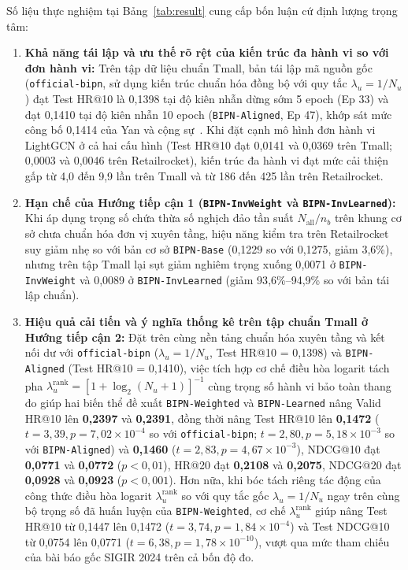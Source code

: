 \documentclass{llncs}
\begin{document}
Số liệu thực nghiệm tại Bảng~\ref{tab:result} cung cấp bốn luận cứ định lượng trọng tâm:
\begin{enumerate}
\item \textbf{Khả năng tái lập và ưu thế rõ rệt của kiến trúc đa hành vi so với đơn hành vi:} Trên tập dữ liệu chuẩn Tmall, bản tái lập mã nguồn gốc (\texttt{official-bipn}, sử dụng kiến trúc chuẩn hóa đồng bộ với quy tắc $\lambda_u = 1/N_u$) đạt Test HR@10 là 0{,}1398 tại độ kiên nhẫn dừng sớm 5 epoch (Ep 33) và đạt 0{,}1410 tại độ kiên nhẫn 10 epoch (\texttt{BIPN-Aligned}, Ep 47), khớp sát mức công bố 0{,}1414 của Yan và cộng sự~\cite{yan2024bipn}. Khi đặt cạnh mô hình đơn hành vi LightGCN ở cả hai cấu hình (Test HR@10 đạt 0{,}0141 và 0{,}0369 trên Tmall; 0{,}0003 và 0{,}0046 trên Retailrocket), kiến trúc đa hành vi đạt mức cải thiện gấp từ 4{,}0 đến 9{,}9 lần trên Tmall và từ 186 đến 425 lần trên Retailrocket.
\item \textbf{Hạn chế của Hướng tiếp cận 1 (\texttt{BIPN-InvWeight} và \texttt{BIPN-InvLearned}):} Khi áp dụng trọng số chứa thừa số nghịch đảo tần suất $N_{\mathrm{all}}/n_b$ trên khung cơ sở chưa chuẩn hóa đơn vị xuyên tầng, hiệu năng kiểm tra trên Retailrocket suy giảm nhẹ so với bản cơ sở \texttt{BIPN-Base} (0{,}1229 so với 0{,}1275, giảm 3{,}6\%), nhưng trên tập Tmall lại sụt giảm nghiêm trọng xuống 0{,}0071 ở \texttt{BIPN-InvWeight} và 0{,}0089 ở \texttt{BIPN-InvLearned} (giảm 93{,}6\%--94{,}9\% so với bản tái lập chuẩn).
\item \textbf{Hiệu quả cải tiến và ý nghĩa thống kê trên tập chuẩn Tmall ở Hướng tiếp cận 2:} Đặt trên cùng nền tảng chuẩn hóa xuyên tầng và kết nối dư với \texttt{official-bipn} ($\lambda_u = 1/N_u$, Test HR@10 = 0{,}1398) và \texttt{BIPN-Aligned} (Test HR@10 = 0{,}1410), việc tích hợp cơ chế điều hòa logarit tách pha $\lambda_u^{\mathrm{rank}} = [1 + \log_2(N_u + 1)]^{-1}$ cùng trọng số hành vi bảo toàn thang đo giúp hai biến thể đề xuất \texttt{BIPN-Weighted} và \texttt{BIPN-Learned} nâng Valid HR@10 lên \textbf{0{,}2397} và \textbf{0{,}2391}, đồng thời nâng Test HR@10 lên \textbf{0{,}1472} ($t = 3{,}39, p = 7{,}02 \times 10^{-4}$ so với \texttt{official-bipn}; $t = 2{,}80, p = 5{,}18 \times 10^{-3}$ so với \texttt{BIPN-Aligned}) và \textbf{0{,}1460} ($t = 2{,}83, p = 4{,}67 \times 10^{-3}$), NDCG@10 đạt \textbf{0{,}0771} và \textbf{0{,}0772} ($p < 0{,}01$), HR@20 đạt \textbf{0{,}2108} và \textbf{0{,}2075}, NDCG@20 đạt \textbf{0{,}0928} và \textbf{0{,}0923} ($p < 0{,}001$). Hơn nữa, khi bóc tách riêng tác động của công thức điều hòa logarit $\lambda_u^{\mathrm{rank}}$ so với quy tắc gốc $\lambda_u = 1/N_u$ ngay trên cùng bộ trọng số đã huấn luyện của \texttt{BIPN-Weighted}, cơ chế $\lambda_u^{\mathrm{rank}}$ giúp nâng Test HR@10 từ 0{,}1447 lên 0{,}1472 ($t = 3{,}74, p = 1{,}84 \times 10^{-4}$) và Test NDCG@10 từ 0{,}0754 lên 0{,}0771 ($t = 6{,}38, p = 1{,}78 \times 10^{-10}$), vượt qua mức tham chiếu của bài báo gốc SIGIR 2024 trên cả bốn độ đo.

\end{enumerate}
\end{document}
